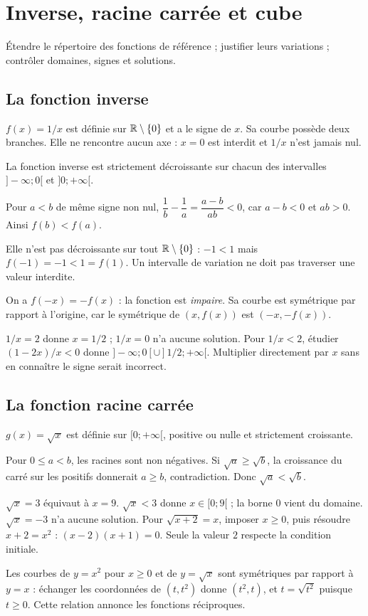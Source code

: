 \documentclass[../cours_2de.tex]{subfiles}
\begin{document}
\setcounter{chapter}{14}
\chapter{Inverse, racine carrée et cube}
\label{sec:ch15}
\begin{objectif}
Étendre le répertoire des fonctions de référence ; justifier leurs variations ; contrôler domaines, signes et solutions.
\end{objectif}
\section{La fonction inverse}
$f(x)=1/x$ est définie sur $\mathbb{R}\setminus\{0\}$ et a le signe de $x$.
Sa courbe possède deux branches. Elle ne rencontre aucun axe : $x=0$ est interdit et $1/x$ n'est jamais nul.
\begin{theoreme}
La fonction inverse est strictement décroissante sur chacun des intervalles $]-\infty;0[$ et $]0;+\infty[$.
\end{theoreme}
\begin{demonstration}
Pour $a<b$ de même signe non nul,
$\dfrac1b-\dfrac1a=\dfrac{a-b}{ab}<0$, car $a-b<0$ et $ab>0$.
Ainsi $f(b)<f(a)$.
\end{demonstration}
\begin{attention}
Elle n'est pas décroissante sur tout $\mathbb{R}\setminus\{0\}$ : $-1<1$ mais $f(-1)=-1<1=f(1)$.
Un intervalle de variation ne doit pas traverser une valeur interdite.
\end{attention}
On a $f(-x)=-f(x)$ : la fonction est \emph{impaire}. Sa courbe est symétrique par rapport à l'origine, car le symétrique de $(x,f(x))$ est $(-x,-f(x))$.
\begin{exemple}
$1/x=2$ donne $x=1/2$ ; $1/x=0$ n'a aucune solution.
Pour $1/x<2$, étudier $(1-2x)/x<0$ donne
$]-\infty;0[\cup]1/2;+\infty[$.
Multiplier directement par $x$ sans en connaître le signe serait incorrect.
\end{exemple}
\section{La fonction racine carrée}
$g(x)=\sqrt x$ est définie sur $[0;+\infty[$, positive ou nulle et strictement croissante.
\begin{demonstration}
Pour $0\leq a<b$, les racines sont non négatives.
Si $\sqrt a\geq\sqrt b$, la croissance du carré sur les positifs donnerait $a\geq b$, contradiction.
Donc $\sqrt a<\sqrt b$.
\end{demonstration}
\begin{exemple}
$\sqrt x=3$ équivaut à $x=9$.
$\sqrt x<3$ donne $x\in[0;9[$ ; la borne $0$ vient du domaine.
$\sqrt x=-3$ n'a aucune solution.
Pour $\sqrt{x+2}=x$, imposer $x\geq0$, puis résoudre $x+2=x^2$ :
$(x-2)(x+1)=0$. Seule la valeur $2$ respecte la condition initiale.
\end{exemple}
\approfondissement Les courbes de $y=x^2$ pour $x\geq0$ et de $y=\sqrt x$ sont symétriques par rapport à $y=x$ : échanger les coordonnées de $(t,t^2)$ donne $(t^2,t)$, et $t=\sqrt{t^2}$ puisque $t\geq0$. Cette relation annonce les fonctions réciproques.
\end{document}
